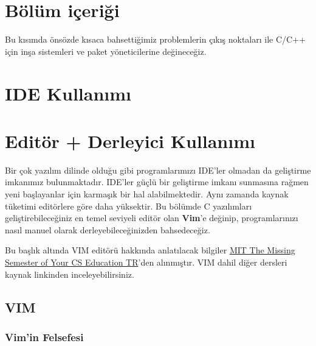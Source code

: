 \documentclass[
]{book}
\begin{document}
\hypertarget{buxf6luxfcm-iuxe7eriux11fi}{%
\section*{Bölüm içeriği}\label{buxf6luxfcm-iuxe7eriux11fi}}

Bu kısımda önsözde kısaca bahsettiğimiz problemlerin çıkış noktaları ile C/C++ için inşa sistemleri ve paket yöneticilerine değineceğiz.

\hypertarget{ide-kullanux131mux131}{%
\section*{IDE Kullanımı}\label{ide-kullanux131mux131}}

\hypertarget{edituxf6r-derleyici-kullanux131mux131}{%
\section*{Editör + Derleyici Kullanımı}\label{edituxf6r-derleyici-kullanux131mux131}}

Bir çok yazılım dilinde olduğu gibi programlarımızı IDE'ler olmadan da geliştirme imkanımız bulunmaktadır. IDE'ler güçlü bir geliştirme imkanı sunmasına rağmen yeni başlayanlar için karmaşık bir hal alabilmektedir. Aynı zamanda kaynak tüketimi editörlere göre daha yüksektir. Bu bölümde C yazılımları geliştirebileceğiniz en temel seviyeli editör olan \textbf{Vim}'e değinip, programlarınızı nasıl manuel olarak derleyebileceğinizden bahsedeceğiz.

Bu başlık altında VIM editörü hakkında anlatılacak bilgiler \href{https://missing-semester-tr.github.io/}{MIT \textbar{} The Missing Semester of Your CS Education TR}'den alınmıştır. VIM dahil diğer dersleri kaynak linkinden inceleyebilirsiniz.

\hypertarget{vim}{%
\subsection*{VIM}\label{vim}}

\hypertarget{vimin-felsefesi}{%
\subsubsection*{Vim'in Felsefesi}\label{vimin-felsefesi}}
\end{document}
